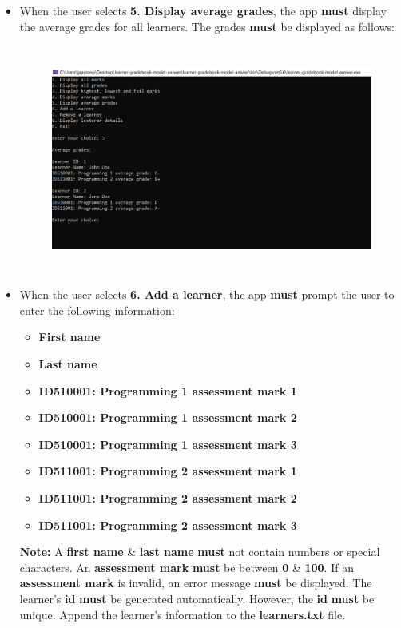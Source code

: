 \documentclass{article}
\begin{document}
\begin{itemize}
\begin{figure}[ht]
    \end{figure}
    \item When the user selects \textbf{5. Display average grades}, the app \textbf{must} display the average grades for all learners. The grades \textbf{must} be displayed as follows:
    \begin{figure}[ht]
        \centering 
        \includegraphics[width=150mm,height=75mm]{../../resources/img/project-1/6.PNG}
    \end{figure}
    \newpage
    \item When the user selects \textbf{6. Add a learner}, the app \textbf{must} prompt the user to enter the following information:
    \begin{itemize}
        \item \textbf{First name}
        \item \textbf{Last name}
        \item \textbf{ID510001: Programming 1 assessment mark 1}
        \item \textbf{ID510001: Programming 1 assessment mark 2}
        \item \textbf{ID510001: Programming 1 assessment mark 3}
        \item \textbf{ID511001: Programming 2 assessment mark 1}
        \item \textbf{ID511001: Programming 2 assessment mark 2}
        \item \textbf{ID511001: Programming 2 assessment mark 3}
    \end{itemize}
    \textbf{Note:} A \textbf{first name} \& \textbf{last name} \textbf{must} not contain numbers or special characters. An \textbf{assessment mark} \textbf{must} be between \textbf{0} \& \textbf{100}. If an \textbf{assessment mark} is invalid, an error message \textbf{must} be displayed. The learner's \textbf{id} \textbf{must} be generated automatically. However, the \textbf{id} \textbf{must} be unique. Append the learner's information to the \textbf{learners.txt} file.  

\end{itemize}
\end{document}
